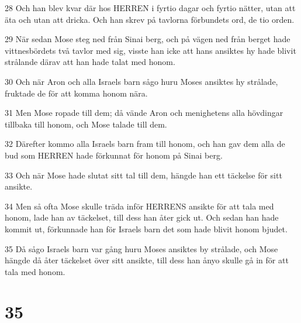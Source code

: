 \par 28 Och han blev kvar där hos HERREN i fyrtio dagar och fyrtio nätter, utan att äta och utan att dricka. Och han skrev på tavlorna förbundets ord, de tio orden.
\par 29 När sedan Mose steg ned från Sinai berg, och på vägen ned från berget hade vittnesbördets två tavlor med sig, visste han icke att hans ansiktes hy hade blivit strålande därav att han hade talat med honom.
\par 30 Och när Aron och alla Israels barn sågo huru Moses ansiktes hy strålade, fruktade de för att komma honom nära.
\par 31 Men Mose ropade till dem; då vände Aron och menighetens alla hövdingar tillbaka till honom, och Mose talade till dem.
\par 32 Därefter kommo alla Israels barn fram till honom, och han gav dem alla de bud som HERREN hade förkunnat för honom på Sinai berg.
\par 33 Och när Mose hade slutat sitt tal till dem, hängde han ett täckelse för sitt ansikte.
\par 34 Men så ofta Mose skulle träda inför HERRENS ansikte för att tala med honom, lade han av täckelset, till dess han åter gick ut. Och sedan han hade kommit ut, förkunnade han för Israels barn det som hade blivit honom bjudet.
\par 35 Då sågo Israels barn var gång huru Moses ansiktes by strålade, och Mose hängde då åter täckelset över sitt ansikte, till dess han ånyo skulle gå in för att tala med honom.

\chapter{35}

